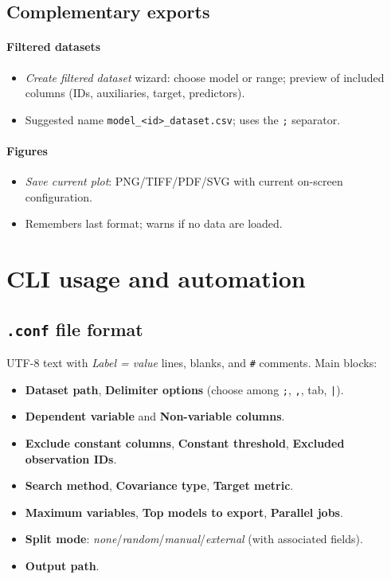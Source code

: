 \documentclass[12pt,a4paper]{article}
\begin{document}
\subsection{Complementary exports}
\paragraph{Filtered datasets}
\begin{itemize}
  \item \emph{Create filtered dataset} wizard: choose model or range; preview of included columns (IDs, auxiliaries, target, predictors).
  \item Suggested name \texttt{model\_\textless id\textgreater\_dataset.csv}; uses the \verb|;| separator.
\end{itemize}

\paragraph{Figures}
\begin{itemize}
  \item \emph{Save current plot}: PNG/TIFF/PDF/SVG with current on-screen configuration.
  \item Remembers last format; warns if no data are loaded.
\end{itemize}

\section{CLI usage and automation}
\subsection{\texttt{.conf} file format}
UTF-8 text with \emph{Label = value} lines, blanks, and \verb|#| comments. Main blocks:
\begin{itemize}
  \item \textbf{Dataset path}, \textbf{Delimiter options} (choose among \verb|;|, \verb|,|, tab, \verb/|/).
  \item \textbf{Dependent variable} and \textbf{Non-variable columns}.
  \item \textbf{Exclude constant columns}, \textbf{Constant threshold}, \textbf{Excluded observation IDs}.
  \item \textbf{Search method}, \textbf{Covariance type}, \textbf{Target metric}.
  \item \textbf{Maximum variables}, \textbf{Top models to export}, \textbf{Parallel jobs}.
  \item \textbf{Split mode}: \emph{none}/\emph{random}/\emph{manual}/\emph{external} (with associated fields).
  \item \textbf{Output path}.
\end{itemize}
\end{document}
